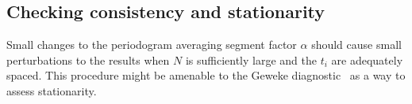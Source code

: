 \documentclass[letterpaper,11pt,nointlimits,reqno]{amsart}
\begin{document}
\subsection*{Checking consistency and stationarity}

Small changes to the periodogram averaging segment factor $\alpha$ should cause
small perturbations to the results when $N$ is sufficiently large and the $t_i$
are adequately spaced.  This procedure might be amenable to the Geweke
diagnostic~\citep{Geweke1992Evaluating} as a way to assess stationarity.

\newcommand*{\doi}[1]{\href{http://dx.doi.org/\detokenize{#1}}{doi: #1}}


\end{document}

